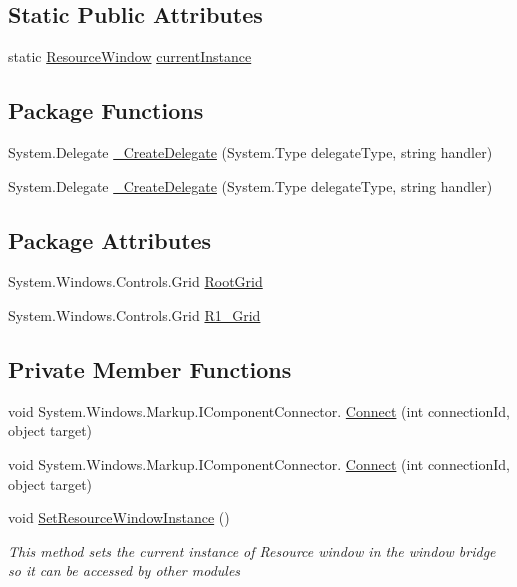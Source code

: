 \subsection*{Static Public Attributes}
\begin{DoxyCompactItemize}
\item 
static \hyperlink{class_c_p_u___o_s___simulator_1_1_resource_window}{Resource\+Window} \hyperlink{class_c_p_u___o_s___simulator_1_1_resource_window_ab7b497079faa3ac3c9cea83834222bb5}{current\+Instance}
\end{DoxyCompactItemize}
\subsection*{Package Functions}
\begin{DoxyCompactItemize}
\item 
System.\+Delegate \hyperlink{class_c_p_u___o_s___simulator_1_1_resource_window_aec0ed6fdc53a3f2466ad3f5606afa26a}{\+\_\+\+Create\+Delegate} (System.\+Type delegate\+Type, string handler)
\item 
System.\+Delegate \hyperlink{class_c_p_u___o_s___simulator_1_1_resource_window_aec0ed6fdc53a3f2466ad3f5606afa26a}{\+\_\+\+Create\+Delegate} (System.\+Type delegate\+Type, string handler)
\end{DoxyCompactItemize}
\subsection*{Package Attributes}
\begin{DoxyCompactItemize}
\item 
System.\+Windows.\+Controls.\+Grid \hyperlink{class_c_p_u___o_s___simulator_1_1_resource_window_ac52733ddcb1f45a5a5a4b7ced2c6a2d5}{Root\+Grid}
\item 
System.\+Windows.\+Controls.\+Grid \hyperlink{class_c_p_u___o_s___simulator_1_1_resource_window_af7214b3d17dc99bd806474accd886b1b}{R1\+\_\+\+Grid}
\end{DoxyCompactItemize}
\subsection*{Private Member Functions}
\begin{DoxyCompactItemize}
\item 
void System.\+Windows.\+Markup.\+I\+Component\+Connector. \hyperlink{class_c_p_u___o_s___simulator_1_1_resource_window_ab91e56d551947c7722ab36ece91d9afe}{Connect} (int connection\+Id, object target)
\item 
void System.\+Windows.\+Markup.\+I\+Component\+Connector. \hyperlink{class_c_p_u___o_s___simulator_1_1_resource_window_ab91e56d551947c7722ab36ece91d9afe}{Connect} (int connection\+Id, object target)
\item 
void \hyperlink{class_c_p_u___o_s___simulator_1_1_resource_window_aed4a851c386f424f5b447cae56c139fe}{Set\+Resource\+Window\+Instance} ()
\begin{DoxyCompactList}\small\item\em This method sets the current instance of Resource window in the window bridge so it can be accessed by other modules \end{DoxyCompactList}\end{DoxyCompactItemize}
